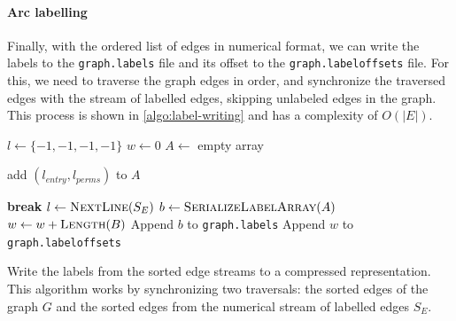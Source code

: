 \paragraph{Arc labelling}
Finally, with the ordered list of edges in numerical format, we can write the
labels to the \texttt{graph.labels} file and its offset to the
\texttt{graph.labeloffsets} file. For this, we need to traverse the graph edges
in order, and synchronize the traversed edges with the stream of labelled
edges, skipping unlabeled edges in the graph. This process is shown in
\cref{algo:label-writing} and has a complexity of $O(|E|)$.

\begin{algorithm}[htb]
    \begin{algorithmic}
        \State $l \gets \{-1, -1, -1, -1\}$ 
         
            \State $w \gets 0$ 
             
                \State $A \gets$ empty array 
                 

                     
                        \State add $(l_\mathit{entry}, l_\mathit{perms})$ to $A$
                    \EndIf

                     
                        \State \textbf{break}
                    \Else
                        \State $l \gets \Call{NextLine}{S_E}$
                    \EndIf
                \EndWhile
                \State $b \gets \Call{SerializeLabelArray}{A}$
                \State $w \gets w + \Call{Length}{B}$
                \State Append $b$ to \texttt{graph.labels}
            \EndFor
            \State Append $w$ to \texttt{graph.labeloffsets}
        \EndFor
        \EndFunction
    \end{algorithmic}

    \caption{Write the labels from the sorted edge streams to a compressed
    representation. This algorithm works by synchronizing two traversals: the
sorted edges of the graph $G$ and the sorted edges from the numerical stream of
labelled edges $S_E$.}%
    \label{algo:label-writing}
\end{algorithm}

